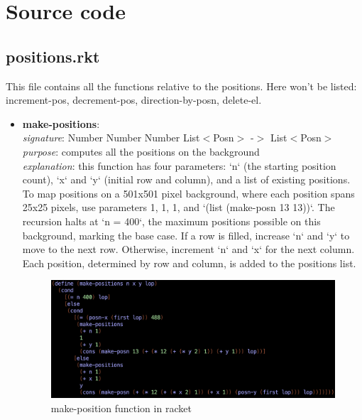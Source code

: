 \documentclass{article}
\begin{document}
	\pagebreak
	
	\section{Source code}
	\subsection{positions.rkt}
	This file contains all the functions relative to the positions.
	Here won't be listed: increment-pos, decrement-pos, direction-by-posn, delete-el.
	\begin{itemize}
		\item \textbf{make-positions}: \\
			\emph{signature}: Number Number Number List$<$Posn$>$ -$>$ List$<$Posn$>$ \\
			\emph{purpose}: computes all the positions on the background \\
			\emph{explanation}: this function has four parameters: `n` (the starting position count), `x` and `y` (initial row and column), and a list of existing positions. To map positions on a 501x501 pixel background, where each position spans 25x25 pixels, use parameters 1, 1, 1, and `(list (make-posn 13 13))`. The recursion halts at `n = 400`, the maximum positions possible on this background, marking the base case. If a row is filled, increase `n` and `y` to move to the next row. Otherwise, increment `n` and `x` for the next column. Each position, determined by row and column, is added to the positions list.
			\begin{figure}[h!]
				\centering
				\includegraphics[width=.6\linewidth]{make-position.png}
				\caption{make-position function in racket}
			\end{figure}
			

\end{itemize}
\end{document}
